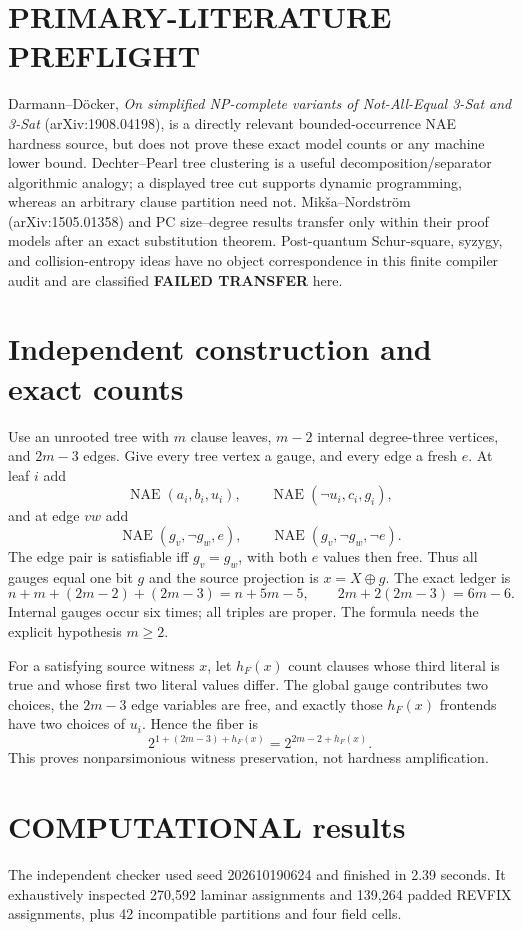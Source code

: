 \documentclass[11pt]{article}
\newcommand{\status}[1]{\textbf{#1}}
\begin{document}
\section*{PRIMARY-LITERATURE PREFLIGHT}
Darmann--D\"ocker, \emph{On simplified NP-complete variants of Not-All-Equal 3-Sat and 3-Sat} (arXiv:1908.04198), is a directly relevant bounded-occurrence NAE hardness source, but does not prove these exact model counts or any machine lower bound.  Dechter--Pearl tree clustering is a useful decomposition/separator algorithmic analogy; a displayed tree cut supports dynamic programming, whereas an arbitrary clause partition need not.  Mik\v{s}a--Nordstr\"om (arXiv:1505.01358) and PC size--degree results transfer only within their proof models after an exact substitution theorem.  Post-quantum Schur-square, syzygy, and collision-entropy ideas have no object correspondence in this finite compiler audit and are classified \status{FAILED TRANSFER} here.

\section*{Independent construction and exact counts}
Use an unrooted tree with $m$ clause leaves, $m-2$ internal degree-three vertices, and $2m-3$ edges.  Give every tree vertex a gauge, and every edge a fresh $e$.  At leaf $i$ add
\[
\operatorname{NAE}(a_i,b_i,u_i),\qquad
\operatorname{NAE}(\neg u_i,c_i,g_i),
\]
and at edge $vw$ add
\[
\operatorname{NAE}(g_v,\neg g_w,e),\qquad
\operatorname{NAE}(g_v,\neg g_w,\neg e).
\]
The edge pair is satisfiable iff $g_v=g_w$, with both $e$ values then free.  Thus all gauges equal one bit $g$ and the source projection is $x=X\oplus g$.  The exact ledger is
\[
n+m+(2m-2)+(2m-3)=n+5m-5,
\qquad 2m+2(2m-3)=6m-6.
\]
Internal gauges occur six times; all triples are proper.  The formula needs the explicit hypothesis $m\ge2$.

For a satisfying source witness $x$, let $h_F(x)$ count clauses whose third literal is true and whose first two literal values differ.  The global gauge contributes two choices, the $2m-3$ edge variables are free, and exactly those $h_F(x)$ frontends have two choices of $u_i$.  Hence the fiber is
\[
2^{1+(2m-3)+h_F(x)}=2^{2m-2+h_F(x)}.
\]
This proves nonparsimonious witness preservation, not hardness amplification.

\section*{COMPUTATIONAL results}
The independent checker used seed 202610190624 and finished in 2.39 seconds.  It exhaustively inspected 270,592 laminar assignments and 139,264 padded REVFIX assignments, plus 42 incompatible partitions and four field cells.
\end{document}
